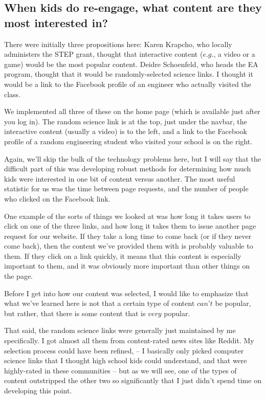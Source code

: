 \documentclass[11pt,a4paper]{article}
\begin{document}
\subsection{When kids do re-engage, what content are they most interested in?}

There were initially three propositions here: Karen Krapcho, who locally administers the STEP grant, thought that interactive content ($\textit{e.g.}$, a video or a game) would be the most popular content. Deidre Schoenfeld, who heads the EA program, thought that it would be randomly-selected science links. I thought it would be a link to the Facebook profile of an engineer who actually visited the class.

We implemented all three of these on the home page (which is available just after you log in).  The random science link is at the top, just under the navbar, the interactive content (usually a video) is to the left, and a link to the Facebook profile of a random engineering student who visited your school is on the right.

Again, we'll skip the bulk of the technology problems here, but I will say that the difficult part of this was developing robust methods for determining how much kids were interested in one bit of content versus another. The most useful statistic for us was the time between page requests, and the number of people who clicked on the Facebook link.

One example of the sorts of things we looked at was how long it takes users to click on one of the three links, and how long it takes them to issue another page request for our website. If they take a long time to come back (or if they never come back), then the content we've provided them with is probably valuable to them. If they click on a link quickly, it means that this content is especially important to them, and it was obviously more important than other things on the page.

Before I get into how our content was selected, I would like to emphasize that what we've learned here is not that a certain type of content $\textit{can't}$ be popular, but rather, that there is some content that is $\textit{very}$ popular.

That said, the random science links were generally just maintained by me specifically. I got almost all them from content-rated news sites like Reddit. My selection process could have been refined, -- I basically only picked computer science links that I thought high school kids could understand, and that were highly-rated in these communities -- but as we will see, one of the types of content outstripped the other two so significantly that I just didn't spend time on developing this point.
\end{document}
